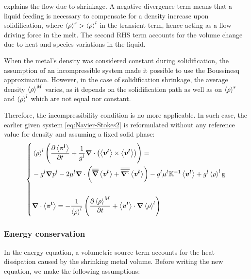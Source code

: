  explains the flow due to shrinkage. 
A negative divergence term means that a liquid feeding 
is necessary to compensate for a density increase upon solidification, where $\left \langle \rho \right \rangle^s > \left \langle \rho \right \rangle^l$ in the transient term, 
hence acting as a flow driving force in the melt.
The second RHS term accounts for the volume change 
due to heat and species variations in the liquid.

When the metal's density was considered constant during solidification, 
the assumption of an incompressible system made it possible to
use the Boussinesq approximation. However, in the case of solidification shrinkage, 
the average density ${\left \langle \rho \right \rangle}^M$ varies, as it depends on the solidification 
path as well as on $\left \langle \rho \right \rangle^s$ and $\left \langle \rho \right \rangle^l$ which are not equal nor constant.

Therefore, the incompressibility condition is no more applicable. In such case, 
the earlier given system \cref{eq:Navier-Stokes2} is reformulated without 
any reference value for density and assuming a fixed solid phase:
\begin{equation}
\label{eq:momentum_balance_metal}
   \left\{
   \begin{aligned}
      & \rhol \brac{\tempup{ \vit } + \frac{1}{\gl} \nabvec \cdot \brac{\vit \times \vit}} = \\
	  &- \gl\nabvec \pl - 2 \mul \nabvec \cdot \brac{\nabmat \vit + \nabmattransp \vit}
	  - \gl \mul \K^{-1} \vit + \gl \rhol \gravity\\ \\
      & \nabvec \cdot \vit = -\frac{1}{\rhol} \brac{\tempup{\avg{\rho}^M} + \vit \cdot  \nabvec \rhol}
    \end{aligned}
    \right.
\end{equation}

\subsubsection{Energy conservation}
In the energy equation, a volumetric source term accounts for the heat dissipation 
caused by the shrinking metal volume. Before writing the new equation, we make the following assumptions:

